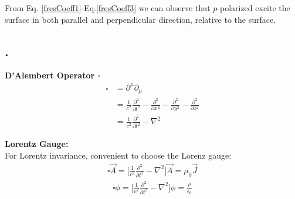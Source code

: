 %
From Eq. \eqref{fresCoeff1}-Eq.\eqref{fresCoeff3} we can observe that $p$-polarized excite the surface in both parallel and perpendicular direction, relative to the surface. 






\subsection{.}


\textbf{D'Alembert Operator $\square$}
\begin{align*}
  \square  &= \partial ^{\mu} \partial _{\mu}
   \\
           &= \frac{1}{c^2} \frac{\partial ^2}{\partial t^2} 
               - \frac{\partial ^2}{\partial x^2} 
               - \frac{\partial ^2}{\partial y^2} 
               - \frac{\partial ^2}{\partial z^2} 
   \\
           &= \frac{1}{c^2} \frac{\partial ^2}{\partial t^2} - \nabla ^2
\end{align*}

\textbf{Lorentz Gauge:} \\
For Lorentz invariance, convenient to choose the Lorenz gauge:
\begin{align*}
   \square \vec{A} = \Bigg[ \frac{1}{c^2} \frac{\partial ^2}{\partial t^2} - \nabla ^2 \Bigg] \vec{A} = \mu_0 \vec{J}
\end{align*}
\begin{align*}
   \square \phi = \Bigg[ \frac{1}{c^2} \frac{\partial ^2}{\partial t^2} - \nabla ^2 \Bigg] \phi = \frac{\rho}{\epsilon _0}
\end{align*}


